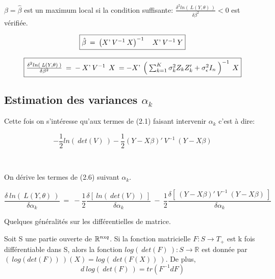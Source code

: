 \documentclass[12pt,fleqn]{book} %
\begin{document}
\vspace{1em}

$\beta=\hat{\beta}$ est un maximum local si la condition suffisante: $\frac{\delta^2 ln(\:\textit{L}(Y,\theta)\:)}{\delta\beta^2}<0$ est vérifiée.


\begin{equation} 
\fbox{$
\hat{\beta}\:=\:\left(  X\textnormal{'}\:V^{-1} \: X \right)^{-1} \quad X\textnormal{'} \:V^{-1}\: Y 
$}
\end{equation}

\begin{equation}
\fbox{$
\frac{\delta^2 ln(\:\textit{L}(Y,\theta)\:)}{\delta\beta^2} \:=\: -\: X\textnormal{'} \:V^{-1}\:\: X
\:= - X\textnormal{'} \: \left( \: \sum_{k=1}^{K} \sigma_k^2 Z_k Z_k'+\sigma_{\epsilon}^2 I_{n} \:\right)^{-1}\: X $}
\end{equation}

\vspace{2em} 


\subsection{Estimation des variances $\alpha_k$}

\vspace{2em}

Cette fois on s'intéresse qu'aux termes de (2.1) faisant intervenir $\alpha_k$ c'est à dire: 

\begin{equation}
-\frac{1}{2} ln(\:det(V)\:) -\frac{1}{2}  (Y-X\beta)'\:V^{-1}\:(Y-X\beta) 
\end{equation}

\

On dérive les termes de (2.6) suivant $\alpha_k$.

\begin{equation} 
\frac{\delta\: ln(\:\textit{L}(Y,\theta)\:) }{\delta \alpha_k} \:=\: -\frac{1}{2}  \frac{ \delta \left[\:ln(\:det(V)\:) \:\right] }{\delta \alpha_k} \:-\: \frac{1}{2}  \frac{\delta \left[\: (Y-X\beta)'\:V^{-1}\:(Y-X\beta)\:\right] }{\delta \alpha_k} 
\end{equation}

\newpage

Quelques généralités sur les différentielles de matrice. 

\vspace{1em}

\begin{theorem}
Soit S une partie ouverte de $\mathbb{R}^{n\textnormal{x}q}$. Si la fonction matricielle $F:S\rightarrow T_{+}$ est k fois différentiable dans S, alors la fonction $log(\:det(F)\:):S\rightarrow \mathbb{R}$ est donnée par $(\:log(det(F))\:)(X)=log(\:det(F(X))\:)$. De plus,
\[ d\:log(\:det(F)\:)=tr(F^{-1} dF) \]
\end{theorem}
\end{document}
